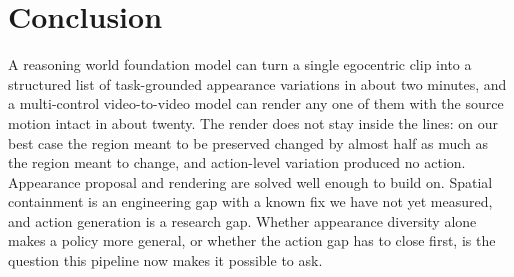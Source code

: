 \section{Conclusion}
A reasoning world foundation model can turn a single egocentric clip into a structured list of task-grounded appearance variations in about two minutes, and a multi-control video-to-video model can render any one of them with the source motion intact in about twenty. The render does not stay inside the lines: on our best case the region meant to be preserved changed by almost half as much as the region meant to change, and action-level variation produced no action. Appearance proposal and rendering are solved well enough to build on. Spatial containment is an engineering gap with a known fix we have not yet measured, and action generation is a research gap. Whether appearance diversity alone makes a policy more general, or whether the action gap has to close first, is the question this pipeline now makes it possible to ask.
